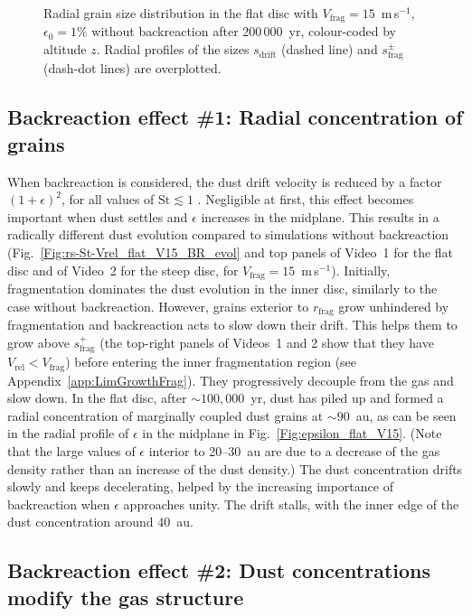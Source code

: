 \documentclass[a4paper,fleqn,usenatbib]{mnras}
\newcommand{\Vrel}{V_\mathrm{rel}}    %
\newcommand{\Vfrag}{V_\mathrm{frag}}  %
\newcommand{\St}{\mathrm{St}}         %
\begin{document}
\begin{figure}
\centering
{}
\caption{Radial grain size distribution in the flat disc with $\Vfrag=15$~m\,s$^{-1}$, $\epsilon_0=1$\% without backreaction after 200\,000~yr, colour-coded by altitude $z$. Radial profiles of the sizes $s_\mathrm{drift}$ (dashed line) and $s_\mathrm{frag}^\pm$ (dash-dot lines) are overplotted.}
\label{Fig:barriers_flat_V15_noBR}
\end{figure}

\subsection{Backreaction effect \#1: Radial concentration of grains}
\label{sec:BReffect1}

When backreaction is considered, the dust drift velocity is reduced by a factor $(1+\epsilon)^2$, for all values of $\St\lesssim1$ \citep{Nakagawa1986}. Negligible at first, this effect becomes important when dust settles and $\epsilon$ increases in the midplane. This results in a radically different dust evolution compared to simulations without backreaction (Fig.~\ref{Fig:rs-St-Vrel_flat_V15_BR_evol} and top panels of Video~1 for the flat disc and of Video~2 for the steep disc, for $\Vfrag=15$~m\,s$^{-1}$). Initially, fragmentation dominates the dust evolution in the inner disc, similarly to the case without backreaction. However, grains exterior to $r_\mathrm{frag}$ grow unhindered by fragmentation and backreaction acts to slow down their drift. This helps them to grow above $s_\mathrm{frag}^+$ (the top-right panels of Videos~1 and 2 show that they have $\Vrel<\Vfrag$) before entering the inner fragmentation region (see Appendix~\ref{app:LimGrowthFrag}). They progressively decouple from the gas and slow down. In the flat disc, after $\sim100,000$~yr, dust has piled up and formed a radial concentration of  marginally coupled dust grains at $\sim90$~au, as can be seen in the radial profile of $\epsilon$ in the midplane in Fig.~\ref{Fig:epsilon_flat_V15}. (Note that the large values of $\epsilon$ interior to 20--30~au are due to a decrease of the gas density rather than an increase of the dust density.) The dust concentration drifts slowly and keeps decelerating, helped by the increasing importance of backreaction when $\epsilon$ approaches unity. The drift stalls, with the inner edge of the dust concentration around 40~au.

\subsection{Backreaction effect \#2: Dust concentrations modify the gas structure}
\label{sec:BReffect2}
\end{document}
